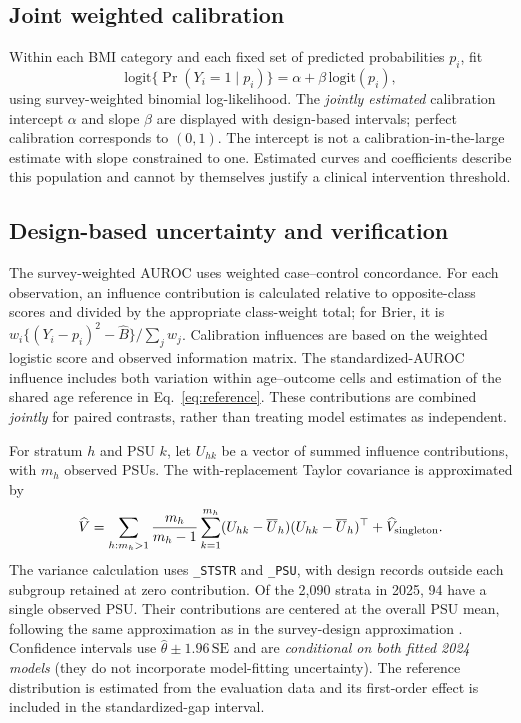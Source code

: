 \subsection{Joint weighted calibration}
Within each BMI category and each fixed set of predicted probabilities $p_i$, fit
\begin{equation}\label{eq:cal}
\mathrm{logit}\{\Pr(Y_i=1\mid p_i)\}=\alpha+\beta\,\mathrm{logit}(p_i),
\end{equation}
using survey-weighted binomial log-likelihood. The \emph{jointly estimated} calibration intercept $\alpha$ and slope $\beta$ are displayed with design-based intervals; perfect calibration corresponds to $(0,1)$. The intercept is not a calibration-in-the-large estimate with slope constrained to one. Estimated curves and coefficients describe this population and cannot by themselves justify a clinical intervention threshold.

\subsection{Design-based uncertainty and verification}
The survey-weighted AUROC uses weighted case--control concordance. For each observation, an influence contribution is calculated relative to opposite-class scores and divided by the appropriate class-weight total; for Brier, it is $w_i\{(Y_i-p_i)^2-\widehat B\}/\sum_jw_j$. Calibration influences are based on the weighted logistic score and observed information matrix. The standardized-AUROC influence includes both variation within age--outcome cells and estimation of the shared age reference in Eq.~\eqref{eq:reference}. These contributions are combined \emph{jointly} for paired contrasts, rather than treating model estimates as independent.

For stratum $h$ and PSU $k$, let $U_{hk}$ be a vector of summed influence contributions, with $m_h$ observed PSUs. The with-replacement Taylor covariance is approximated by
\begin{equation}\label{eq:variance}
\widehat V=\sum_{h:m_h>1}\frac{m_h}{m_h-1}\sum_{k=1}^{m_h}(U_{hk}-\overline U_h)(U_{hk}-\overline U_h)^\top+\widehat V_{\rm singleton}.
\end{equation}
The variance calculation uses \texttt{\_STSTR} and \texttt{\_PSU}, with design records outside each subgroup retained at zero contribution. Of the 2,090 strata in 2025, 94 have a single observed PSU. Their contributions are centered at the overall PSU mean, following the same approximation as in the survey-design approximation \citep{cdcweights,lumley}. Confidence intervals use $\widehat\theta\pm1.96\,\mathrm{SE}$ and are \emph{conditional on both fitted 2024 models} (they do not incorporate model-fitting uncertainty). The reference distribution is estimated from the evaluation data and its first-order effect is included in the standardized-gap interval.

